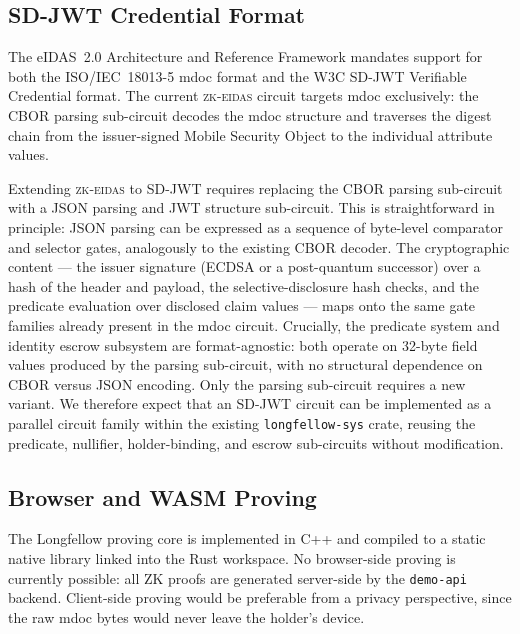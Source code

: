 \subsection{SD-JWT Credential Format}\label{sec:disc-sdjwt}

The eIDAS~2.0 Architecture and Reference Framework mandates support for both the
ISO/IEC~18013-5 mdoc format and the W3C SD-JWT Verifiable Credential format.
The current \textsc{zk-eidas} circuit targets mdoc exclusively: the CBOR parsing
sub-circuit decodes the mdoc structure and traverses the digest chain from the
issuer-signed Mobile Security Object to the individual attribute values.

Extending \textsc{zk-eidas} to SD-JWT requires replacing the CBOR parsing sub-circuit
with a JSON parsing and JWT structure sub-circuit.
This is straightforward in principle: JSON parsing can be expressed as a sequence of
byte-level comparator and selector gates, analogously to the existing CBOR decoder.
The cryptographic content --- the issuer signature (ECDSA or a post-quantum successor)
over a hash of the header and payload, the selective-disclosure hash checks, and the
predicate evaluation over disclosed claim values --- maps onto the same gate families
already present in the mdoc circuit.
Crucially, the predicate system and identity escrow subsystem are format-agnostic: both
operate on 32-byte field values produced by the parsing sub-circuit, with no structural
dependence on CBOR versus JSON encoding.
Only the parsing sub-circuit requires a new variant.
We therefore expect that an SD-JWT circuit can be implemented as a parallel circuit
family within the existing \texttt{longfellow-sys} crate, reusing the predicate,
nullifier, holder-binding, and escrow sub-circuits without modification.

\subsection{Browser and WASM Proving}\label{sec:disc-wasm}

The Longfellow proving core is implemented in C++ and compiled to a static native library
linked into the Rust workspace.
No browser-side proving is currently possible: all ZK proofs are generated server-side
by the \texttt{demo-api} backend.
Client-side proving would be preferable from a privacy perspective, since the raw mdoc
bytes would never leave the holder's device.

